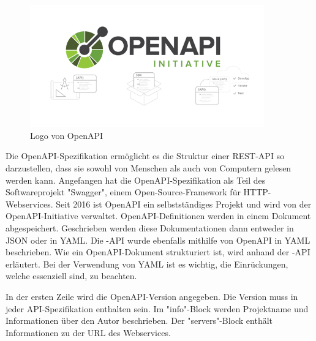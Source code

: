 \begin{figure}[H]
    \includegraphics[width=0.9\textwidth]{media/OpenAPI/Logo.png}
    \centering
    \caption{Logo von OpenAPI \cite{OpenAPI}}
\end{figure}


Die OpenAPI-Spezifikation ermöglicht es die Struktur einer REST-API so darzustellen, dass sie sowohl von Menschen als auch von Computern gelesen werden kann. Angefangen hat die OpenAPI-Spezifikation als Teil des Softwareprojekt "Swagger", einem Open-Source-Framework für HTTP-Webservices. Seit 2016 ist OpenAPI ein selbstständiges Projekt und wird von der OpenAPI-Initiative verwaltet. OpenAPI-Definitionen werden in einem Dokument abgespeichert. Geschrieben werden diese Dokumentationen dann entweder in JSON oder in YAML. Die \ZELIA-API wurde ebenfalls mithilfe von OpenAPI in YAML beschrieben. Wie ein OpenAPI-Dokument strukturiert ist, wird anhand der \ZELIA-API erläutert. Bei der Verwendung von YAML ist es wichtig, die Einrückungen, welche essenziell sind, zu beachten.




In der ersten Zeile wird die OpenAPI-Version angegeben. Die Version muss in jeder API-Spezifikation enthalten sein. Im "info"-Block werden Projektname und Informationen über den Autor beschrieben. Der "servers"-Block enthält Informationen zu der URL des Webservices. \cite{OpenAPI}



